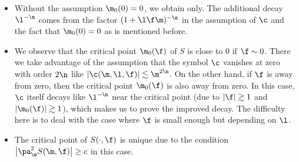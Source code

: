 \begin{Remark}\quad
\begin{itemize}\itemsep=0pt
\item[(1)] Without the assumption $\m_0(0)=0$, we obtain  only. The additional decay~$\l^{-\n}$ comes from the factor $(1+\l \f\m)^{-\n}$ in the assumption of $\c$ and the fact that $\m_0(0)=0$ as is mentioned before.

\item[(2)] We observe that the critical point $\m_0(\f)$ of $S$ is close to $0$ if $\f\sim 0$. There we take advantage of the assumption that the symbol $\c$ vanishes at zero with order $2\n$ like $|\c(\m,\l,\f)|\lesssim \m^{2\n}$. On the other hand, if $\f$ is away from zero, then the critical point $\m_0(\f)$ is also away from zero. In this case, $\c$ itself decays like $\l^{-\n}$ near the critical point (due to $|\f|\gtrsim 1$ and~${|\m_0(\f)|\gtrsim 1}$), which makes us to prove the improved decay. The difficulty here is to deal with the case where $\f$ is small enough but depending on $\l$.

\item[(3)]
The critical point of $S(\cdot,\f)$ is unique due to the condition $\big|\pa_{\m}^2S(\m,\f)\big|\geq c$ in this case.
\end{itemize}
\end{Remark}

